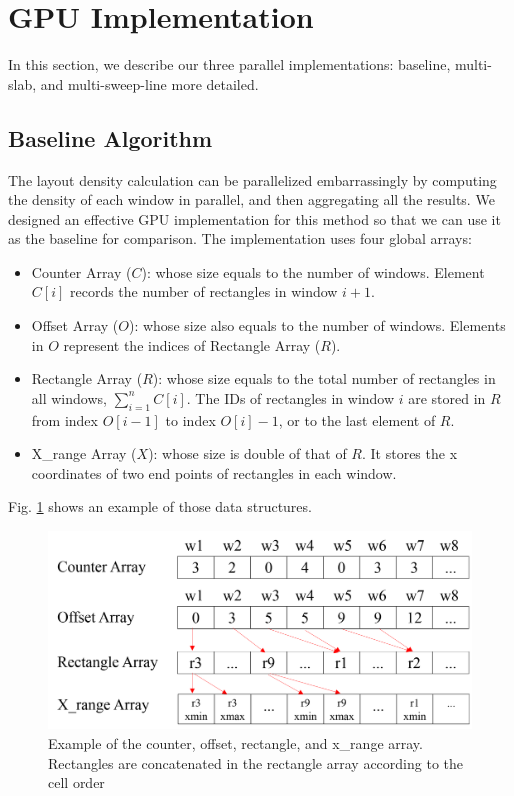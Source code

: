 \section{GPU Implementation}
In this section, we describe our three parallel implementations: baseline, multi-slab, and multi-sweep-line more detailed.

\subsection{Baseline Algorithm}
The layout density calculation can be parallelized embarrassingly by computing the density of each window in parallel, and then aggregating all the results.  We designed an effective GPU implementation for this method so that we can use it as the baseline for comparison.  The implementation uses four global arrays:
\begin{itemize}
    \item Counter Array ($C$): whose size equals to the number of windows.  Element $C[i]$ records the number of rectangles in window $i+1$.
    \item Offset Array ($O$): whose size also equals to the number of windows.  Elements in $O$ represent the indices of Rectangle Array ($R$).  
    \item Rectangle Array ($R$): whose size equals to the total number of rectangles in all windows, $\sum_{i=1}^n C[i]$.  The IDs of rectangles in window $i$ are stored in $R$ from index $O[i-1]$ to index $O[i]-1$, or to the last element of $R$.
    \item X\_range Array ($X$): whose size is double of that of $R$. It stores the x coordinates of two end points of rectangles in each window.
\end{itemize}
Fig. \ref{fig:fig_3_3} shows an example of those data structures.  
\begin{figure}[h]
    \centering
    \includegraphics[scale=0.4]{image/fig_3_3}
    \caption{Example of the counter, offset, rectangle, and x\_range array. Rectangles are concatenated in the rectangle array according to the cell order}
    \label{fig:fig_3_3}
\end{figure}



